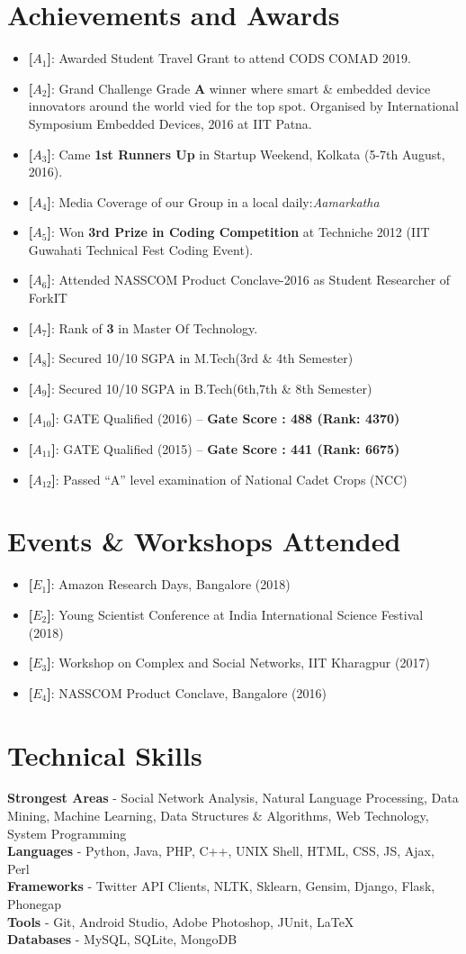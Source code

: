 \documentclass[letterpaper,11pt]{article}
\newcommand{\resumeItem}[2]{
  \item\small{
    \textbf{#1}{: #2 \vspace{-2pt}}
  }
}
\newcommand{\resumeSubItem}[2]{\resumeItem{#1}{#2}\vspace{-4pt}}
\newcommand{\resumeSubHeadingListStart}{\begin{itemize}[leftmargin=*,label={}]}
\newcommand{\resumeSubHeadingListEnd}{\end{itemize}}
\begin{document}
\section{Achievements and Awards}
\resumeSubHeadingListStart
  \resumeSubItem{[$A_1$]}{Awarded Student Travel Grant to attend CODS COMAD 2019.}
 \resumeSubItem{[$A_2$]}{Grand Challenge Grade \textbf{A} winner where smart \& embedded device innovators around the world vied for the top spot. Organised by International Symposium Embedded Devices, 2016 at IIT Patna.}
 \resumeSubItem{[$A_3$]}{Came \textbf{1st Runners Up} in Startup Weekend, Kolkata (5-7th August, 2016).}
 \resumeSubItem{[$A_4$]}{Media Coverage of our Group in a local daily:\textit{Aamarkatha}}
 \resumeSubItem{[$A_5$]}{Won \textbf{3rd Prize in Coding Competition} at Techniche 2012 (IIT Guwahati Technical Fest Coding Event).}
 \resumeSubItem{[$A_6$]}{Attended NASSCOM Product Conclave-2016 as Student Researcher of ForkIT}
 \resumeSubItem{[$A_7$]}{Rank of \textbf{3} in Master Of Technology.}
 \resumeSubItem{[$A_8$]}{Secured 10/10 SGPA in M.Tech(3rd \& 4th Semester)}
 \resumeSubItem{[$A_9$]}{Secured 10/10 SGPA in B.Tech(6th,7th \& 8th Semester)}
 \resumeSubItem{[$A_{10}$]}{GATE Qualified (2016) – \textbf{Gate Score : 488 (Rank: 4370)}}
 \resumeSubItem{[$A_{11}$]}{GATE Qualified (2015) – \textbf{Gate Score : 441 (Rank: 6675)}}
 \resumeSubItem{[$A_{12}$]}{Passed “A” level examination of National Cadet Crops (NCC)}
\resumeSubHeadingListEnd



\section{Events \& Workshops Attended}
\resumeSubHeadingListStart
 \resumeSubItem{[$E_{1}$]}{Amazon Research Days, Bangalore (2018)}
  \resumeSubItem{[$E_{2}$]}{Young Scientist Conference at India International Science Festival (2018)}
 \resumeSubItem{[$E_{3}$]}{Workshop on Complex and Social Networks, IIT Kharagpur (2017)}
 \resumeSubItem{[$E_{4}$]}{NASSCOM Product Conclave, Bangalore (2016)}
\resumeSubHeadingListEnd


\section{Technical Skills}
\textbf{Strongest Areas} - Social Network Analysis, Natural Language Processing, Data Mining, Machine Learning, Data Structures \& Algorithms, Web Technology, System Programming \\
\textbf{Languages} - Python, Java, PHP, C++, UNIX Shell, HTML, CSS, JS, Ajax, Perl \\
\textbf{Frameworks} - Twitter API Clients, NLTK, Sklearn, Gensim, Django, Flask, Phonegap \\
\textbf{Tools} - Git, Android Studio, Adobe Photoshop, JUnit, \LaTeX \\
\textbf{Databases} - MySQL, SQLite, MongoDB \\
\end{document}
